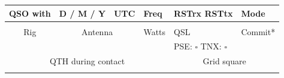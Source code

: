 \documentclass{article}
\begin{document}
\vspace*{0.01in}
\begin{center}
\begin{tabular}{|l|l|l|l|l|l|l|}
\hline
\multicolumn{2}{|c|}{QSO with} & D / M / Y & UTC & Freq & RSTrx \hfill RSTtx & Mode \\
\hline 
\multicolumn{2}{|c|}{\phantom{.....}} & & & & & \\
\hline
\multicolumn{2}{|c|}{Rig} & \multicolumn{2}{c|}{Antenna} & Watts & \phantom{QSLL}QSL & Commit* \\
\hline 
\multicolumn{2}{|c|}{\phantom{.....}} & \multicolumn{2}{c|}{\phantom{.}} &   & PSE: $\square$ TNX: $\square$ &  \\
\hline
\multicolumn{5}{|c|}{QTH during contact} & \multicolumn{2}{c|}{Grid square} \\ 
\hline 
\multicolumn{5}{|c|}{\phantom{.}} & \multicolumn{2}{c|}{\phantom{.}} \\
\hline
\end{tabular} 
\end{center}
\vfill
\end{document}
